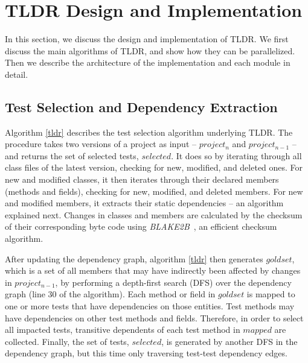 \chapter{TLDR Design and Implementation}
\label{sec:Implementation}

In this section, we discuss the design and implementation of TLDR. We first discuss the main algorithms of TLDR, and show how they can be parallelized. Then we describe the architecture of the implementation and each module in detail. 

\section{Test Selection and Dependency Extraction}

Algorithm \ref{tldr} describes the test selection algorithm underlying TLDR. The procedure takes two versions of a project as input -- $project_{n}$ and $project_{n-1}$ -- and returns the set of selected tests, $selected$. It does so by iterating through all class files of the latest version, checking for new, modified, and deleted ones. For new and modified classes, it then iterates through their declared members (methods and fields), checking for new, modified, and deleted members. For new and modified members, it extracts their static dependencies -- an algorithm explained next. Changes in classes and members are calculated by the checksum of their corresponding byte code using \textit{BLAKE2B}~\cite{aumasson2013blake2}, an efficient checksum algorithm. 

After updating the dependency graph, algorithm \ref{tldr} then generates $goldset$, which is a set of all members that may have indirectly been affected by changes in $project_{n-1}$, by performing a depth-first search (DFS) over the dependency graph (line 30 of the algorithm). Each method or field in $goldset$ is mapped to one or more tests that have dependencies on those entities. Test methods may have dependencies on other test methods and fields. Therefore, in order to select all impacted tests, transitive dependents of each test method in $mapped$ are collected. Finally, the set of tests, $selected$, is generated by another DFS in the dependency graph, but this time only traversing test-test dependency edges. 

